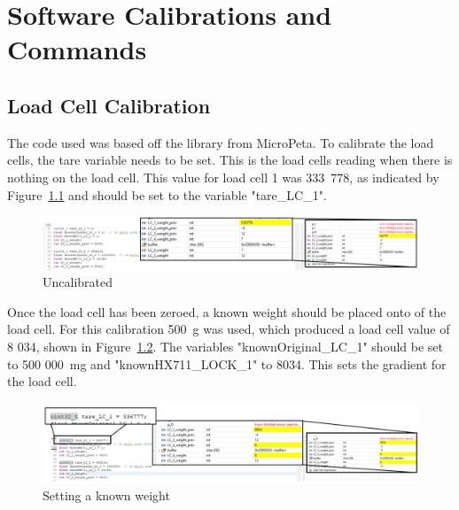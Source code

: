 \chapter{Software Calibrations and Commands}
\label{sec: Appendix_software}
\vspace*{-2mm}
\section{Load Cell Calibration}
    The code used was based off the library from MicroPeta\citep{loadcellProgram}. To calibrate the load cells, the tare variable needs to be set. This is the load cells reading when there is nothing on the load cell. This value for load cell 1 was 333~778, as indicated by Figure~\ref{fig: Uncalibrated} and should be set to the variable "tare\_LC\_1". 
    \vspace*{-2mm}
    \begin{figure}[H]
        \centering
        \includegraphics*[width =\textwidth]{Appendix Documents/Calibration1.png}
        \caption{Uncalibrated}
        \label{fig: Uncalibrated}
    \end{figure}
    \vspace*{-3mm}
    Once the load cell has been zeroed,  a known weight should be placed onto of the load cell. For this calibration 500~g was used, which produced a load cell value of 8 034, shown in Figure~\ref{fig: known_weight}. The variables "knownOriginal\_LC\_1" should be set to 500 000~mg and "knownHX711\_LOCK\_1" to 8034. This sets the gradient for the load cell.
    \vspace*{-2mm}
    \begin{figure}[h]
        \centering
        \includegraphics*[width =\textwidth]{Appendix Documents/Calibration2.png}
        \caption{Setting a known weight}
        \label{fig: known_weight}
    \end{figure}
    
